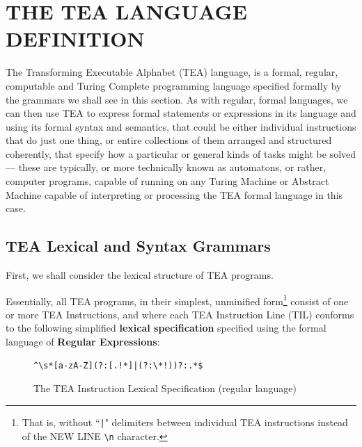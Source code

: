 \documentclass[a4paper, 18pt]{book} %
\begin{document}
\chapter{THE TEA LANGUAGE DEFINITION}
\label{SEC2}

The Transforming Executable Alphabet (TEA) language, is a formal, regular, computable and Turing Complete programming language specified formally by the grammars we shall see in this section. As with regular, formal languages, we can then use TEA to express formal statements or expressions in its language and using its formal syntax and semantics, that could be either individual instructions that do just one thing, or entire collections of them arranged and structured coherently, that specify how a particular or general kinds of tasks might be solved --- these are typically, or more technically known as automatons, or rather, computer programs, capable of running on any Turing Machine or Abstract Machine capable of interpreting or processing the TEA formal language in this case.


\section{TEA Lexical and Syntax Grammars}
\label{SECGRAM}

First, we shall consider the lexical structure of TEA programs.

Essentially, all TEA programs, in their simplest, unminified form\footnote{That is, without 
``\texttt{|}" delimiters between individual TEA instructions  instead of the NEW LINE \texttt{\textbackslash n} character.} consist of one or more TEA Instructions, and where each TEA Instruction Line (TIL) conforms to the following simplified \textbf{lexical specification} specified using the formal language of \textbf{Regular Expressions}:



\begin{figure}[H]
  \centering
  \begin{tcolorbox}[myterminalstyle, title=TEA Instruction Line (Regular Expression)]
  \begin{lstlisting}
^\s*[a-zA-Z](?:[.!*]|(?:\*!))?:.*$
  \end{lstlisting}
  \end{tcolorbox}
  \caption{The TEA Instruction Lexical Specification (regular language)}
  \label{FIG1}
\end{figure}

    
\end{document}
